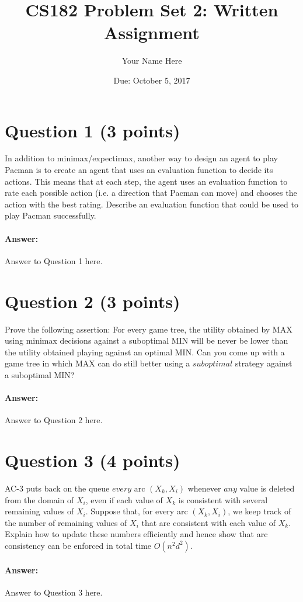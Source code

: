 \documentclass[11pt,letter]{article}
\begin{document}
\title{CS182 Problem Set 2: Written Assignment}
\author{Your Name Here}
\date{Due: October 5, 2017}
\maketitle 


\section*{Question 1 (3 points)}

In addition to minimax/expectimax, another way to design an agent to play Pacman is to create an agent that uses an evaluation function to decide its actions. This means that at each step, the agent uses an evaluation function to rate each possible action (i.e. a direction that Pacman can move) and chooses the action with the best rating. Describe an evaluation function that could be used to play Pacman successfully.

\paragraph{Answer:} Answer to Question 1 here.

\section*{Question 2 (3 points)}

Prove the following assertion: For every game tree, the utility obtained by MAX using minimax decisions against a suboptimal MIN will be never be lower than the utility obtained playing against an optimal MIN. Can you come up with a game tree in which MAX can do still better using a $suboptimal$ strategy against a suboptimal MIN?

\paragraph{Answer:} Answer to Question 2 here.

\section*{Question 3 (4 points)}

AC-3 puts back on the queue $every$ arc $(X_k, X_i)$ whenever $any$ value is deleted from the domain of $X_i$, even if each value of $X_k$ is consistent with several remaining values of $X_i$. Suppose that, for every arc $(X_k, X_i)$, we keep track of the number of remaining values of $X_i$ that are consistent with each value of $X_k$. Explain how to update these numbers efficiently and hence show that arc consistency can be enforced in total time $O(n^2d^2)$.

\paragraph{Answer:} Answer to Question 3 here.
\end{document}
